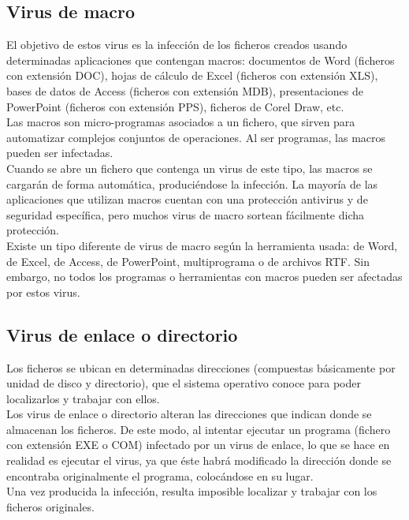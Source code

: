 \documentclass[12pt,a4paper]{article}
\begin{document}
	\subsection{Virus de macro}
	El objetivo de estos virus es la infección de los ficheros creados usando determinadas aplicaciones que contengan macros: documentos de Word (ficheros con extensión DOC), hojas de cálculo de Excel (ficheros con extensión XLS), bases de datos de Access (ficheros con extensión MDB), presentaciones de PowerPoint (ficheros con extensión PPS), ficheros de Corel Draw, etc.\\
	
	Las macros son micro-programas asociados a un fichero, que sirven para automatizar complejos conjuntos de operaciones. Al ser programas, las macros pueden ser infectadas.\\
	
	Cuando se abre un fichero que contenga un virus de este tipo, las macros se cargarán de forma automática, produciéndose la infección. La mayoría de las aplicaciones que utilizan macros cuentan con una protección antivirus y de seguridad específica, pero muchos virus de macro sortean fácilmente dicha protección.\\
	
	Existe un tipo diferente de virus de macro según la herramienta usada: de Word, de Excel, de Access, de PowerPoint, multiprograma o de archivos RTF. Sin embargo, no todos los programas o herramientas con macros pueden ser afectadas por estos virus.
	
	\subsection{Virus de enlace o directorio}
	Los ficheros se ubican en determinadas direcciones (compuestas básicamente por unidad de disco y directorio), que el sistema operativo conoce para poder localizarlos y trabajar con ellos.\\
	
	Los virus de enlace o directorio alteran las direcciones que indican donde se almacenan los ficheros. De este modo, al intentar ejecutar un programa (fichero con extensión EXE o COM) infectado por un virus de enlace, lo que se hace en realidad es ejecutar el virus, ya que éste habrá modificado la dirección donde se encontraba originalmente el programa, colocándose en su lugar.\\
	
	Una vez producida la infección, resulta imposible localizar y trabajar con los ficheros originales.
	
\end{document}
